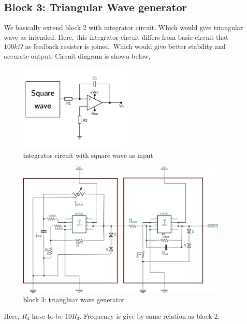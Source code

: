 \documentclass[14pt,a4paper]{extarticle}
\begin{document}
\subsection{Block 3: Triangular Wave generator}
\label{sec:orgad00aa8}

We basically extend block 2 with integrator circuit. Which would give triangular wave as intended. Here, this integrator circuit differs from basic circuit that \(100k\Omega\) as feedback resister is joined. Which would give better stability and accurate output. Circuit diagram is shown below,


\begin{figure}[H]
    \centering
    \includegraphics[width=0.5\textwidth]{imgs/triang.png}
    \caption{integrator circuit with square wave as input}
    \label{fig:triang}
\end{figure}

\begin{figure}[H]
    \centering
    \includegraphics[width=0.95\textwidth]{imgs/triangreal.png}
    \caption{block 3: triangluar wave generator}
    \label{fig:tringularreal}
\end{figure}

Here, \(R_{4}\) have to be \(10R_{3}\). Frequency is give by same relation as block 2.
\end{document}
